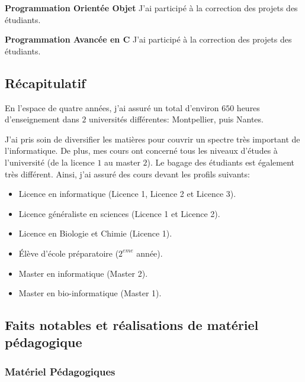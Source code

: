 {\bf Programmation Orientée Objet} J'ai participé à la correction des projets des étudiants.

{\bf Programmation Avancée en C} J'ai participé à la correction des projets des étudiants.

\subsection{Récapitulatif}

En l'espace de quatre années, j'ai assuré un total d'environ $650$ heures d'enseignement dans $2$ universités différentes: Montpellier, puis Nantes.

J'ai pris soin de diversifier les matières pour couvrir un spectre très important de l'informatique. De plus, mes cours ont concerné tous les niveaux d'études à l'université (de la licence $1$ au master $2$). Le bagage des étudiants est également très différent. Ainsi, j'ai assuré des cours devant les profils suivants:

\begin{itemize}
\item Licence en informatique (Licence 1, Licence 2 et Licence 3).
\item Licence généraliste en sciences (Licence 1 et Licence 2).
\item Licence en Biologie et Chimie (Licence 1).
\item Élève d'école préparatoire ($2^{eme}$ année).
\item Master en informatique (Master 2).
\item Master en bio-informatique (Master 1).
\end{itemize} 

\subsection[Faits notables]{Faits notables et réalisations de matériel pédagogique}

\subsubsection*{Matériel Pédagogiques}

